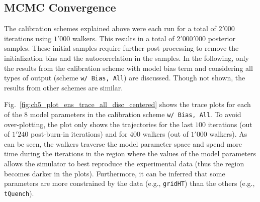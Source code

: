 \subsection{MCMC Convergence}\label{sub:bc_mcmc_convergence}

The calibration schemes explained above were each run for a total of $2'000$ iterations using $1'000$ walkers. 
This results in a total of $2'000'000$ posterior samples.
These initial samples require further post-process\-ing to remove the initialization bias and the autocorrelation in the samples.
In the following, only the results from the calibration scheme with model bias term and considering all types of output (scheme \texttt{w/ Bias, All}) are discussed.
Though not shown, the results from other schemes are similar.

Fig.~\ref{fig:ch5_plot_ens_trace_all_disc_centered} shows the trace plots for each of the $8$ model parameters in the calibration scheme \texttt{w/ Bias, All}.
To avoid over-plotting, the plot only shows the trajectories for the last $100$ iterations (out of $1'240$ post-burn-in iterations) and for $400$ walkers (out of $1'000$ walkers). 
As can be seen, the walkers traverse the model parameter space and spend more time during the iterations in the region where the values of the model parameters allows the simulator to best reproduce the experimental data (thus the region becomes darker in the plots).
Furthermore, it can be inferred that some parameters are more constrained by the data (e.g., \texttt{gridHT}) than the others (e.g., \texttt{tQuench}).

